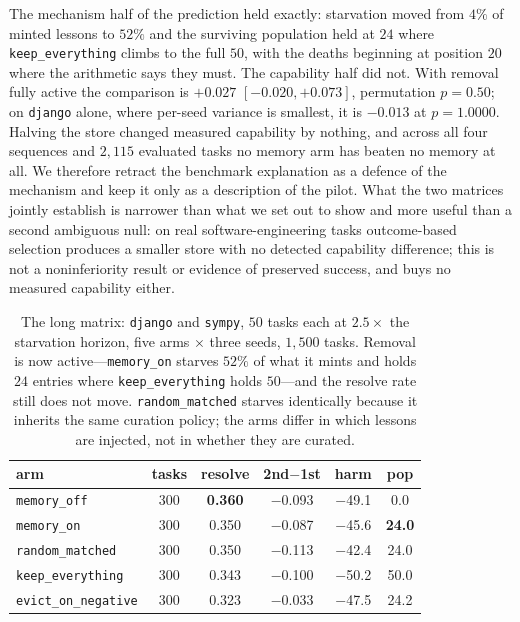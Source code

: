 The mechanism half of the prediction held exactly: starvation moved from
$4\%$ of minted lessons to $52\%$ and the surviving population held at
$24$ where \texttt{keep\_everything} climbs to the full $50$, with the
deaths beginning at position $20$ where the arithmetic says they must.
The capability half did not. With removal fully active the comparison is
$+0.027$ $[-0.020, +0.073]$, permutation $p = 0.50$; on \texttt{django}
alone, where per-seed variance is smallest, it is $-0.013$ at
$p = 1.0000$. Halving the store changed measured capability by nothing,
and across all four sequences and $2{,}115$ evaluated tasks no memory arm
has beaten no memory at all. We therefore retract the benchmark
explanation as a defence of the mechanism and keep it only as a
description of the pilot. What the two matrices jointly establish is
narrower than what we set out to show and more useful than a second
ambiguous null: on real software-engineering tasks outcome-based
selection produces a smaller store with no detected capability difference;
this is not a noninferiority result or evidence of preserved success, and
buys no measured capability either.

\begin{table}[t]
\centering
\tabsize
\caption{The long matrix: \texttt{django} and \texttt{sympy}, $50$ tasks
each at $2.5\times$ the starvation horizon, five arms $\times$ three
seeds, $1{,}500$ tasks. Removal is now active---\texttt{memory\_on}
starves $52\%$ of what it mints and holds $24$ entries where
\texttt{keep\_everything} holds $50$---and the resolve rate still does
not move. \texttt{random\_matched} starves identically because it
inherits the same curation policy; the arms differ in which lessons are
injected, not in whether they are curated.}
\label{tab:swebench-long}
\begin{tabular}{lccccc}
\toprule
arm & tasks & resolve & 2nd$-$1st & harm & pop \\
\midrule
\texttt{memory\_off}       & 300 & \textbf{0.360} & $-$0.093 & $-$49.1 & 0.0 \\
\texttt{memory\_on}        & 300 & 0.350 & $-$0.087 & $-$45.6 & \textbf{24.0} \\
\texttt{random\_matched}   & 300 & 0.350 & $-$0.113 & $-$42.4 & 24.0 \\
\texttt{keep\_everything}  & 300 & 0.343 & $-$0.100 & $-$50.2 & 50.0 \\
\texttt{evict\_on\_negative} & 300 & 0.323 & $-$0.033 & $-$47.5 & 24.2 \\
\bottomrule
\end{tabular}
\end{table}

